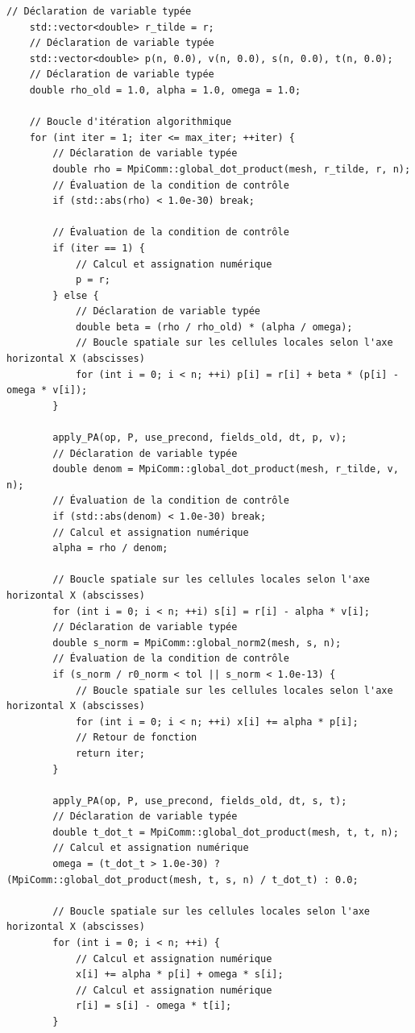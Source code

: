 \documentclass[10pt,a4paper,oneside]{book}
\begin{document}
\begin{lstlisting}[language={[11]C++}]
    // Déclaration de variable typée
    std::vector<double> r_tilde = r;
    // Déclaration de variable typée
    std::vector<double> p(n, 0.0), v(n, 0.0), s(n, 0.0), t(n, 0.0);
    // Déclaration de variable typée
    double rho_old = 1.0, alpha = 1.0, omega = 1.0;

    // Boucle d'itération algorithmique
    for (int iter = 1; iter <= max_iter; ++iter) {
        // Déclaration de variable typée
        double rho = MpiComm::global_dot_product(mesh, r_tilde, r, n);
        // Évaluation de la condition de contrôle
        if (std::abs(rho) < 1.0e-30) break;

        // Évaluation de la condition de contrôle
        if (iter == 1) {
            // Calcul et assignation numérique
            p = r;
        } else {
            // Déclaration de variable typée
            double beta = (rho / rho_old) * (alpha / omega);
            // Boucle spatiale sur les cellules locales selon l'axe horizontal X (abscisses)
            for (int i = 0; i < n; ++i) p[i] = r[i] + beta * (p[i] - omega * v[i]);
        }

        apply_PA(op, P, use_precond, fields_old, dt, p, v);
        // Déclaration de variable typée
        double denom = MpiComm::global_dot_product(mesh, r_tilde, v, n);
        // Évaluation de la condition de contrôle
        if (std::abs(denom) < 1.0e-30) break;
        // Calcul et assignation numérique
        alpha = rho / denom;

        // Boucle spatiale sur les cellules locales selon l'axe horizontal X (abscisses)
        for (int i = 0; i < n; ++i) s[i] = r[i] - alpha * v[i];
        // Déclaration de variable typée
        double s_norm = MpiComm::global_norm2(mesh, s, n);
        // Évaluation de la condition de contrôle
        if (s_norm / r0_norm < tol || s_norm < 1.0e-13) {
            // Boucle spatiale sur les cellules locales selon l'axe horizontal X (abscisses)
            for (int i = 0; i < n; ++i) x[i] += alpha * p[i];
            // Retour de fonction
            return iter;
        }

        apply_PA(op, P, use_precond, fields_old, dt, s, t);
        // Déclaration de variable typée
        double t_dot_t = MpiComm::global_dot_product(mesh, t, t, n);
        // Calcul et assignation numérique
        omega = (t_dot_t > 1.0e-30) ? (MpiComm::global_dot_product(mesh, t, s, n) / t_dot_t) : 0.0;

        // Boucle spatiale sur les cellules locales selon l'axe horizontal X (abscisses)
        for (int i = 0; i < n; ++i) {
            // Calcul et assignation numérique
            x[i] += alpha * p[i] + omega * s[i];
            // Calcul et assignation numérique
            r[i] = s[i] - omega * t[i];
        }


\end{lstlisting}
\end{document}
